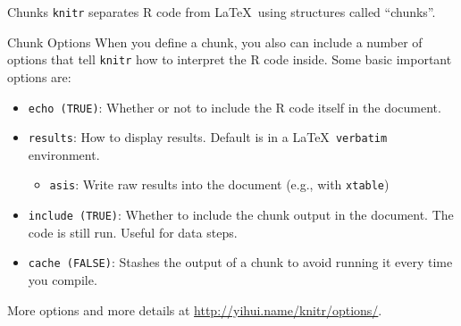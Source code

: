 \documentclass{beamer}
\begin{document}
	\begin{frame}{Chunks}
		\texttt{knitr} separates R code from \LaTeX \ using structures called ``chunks''.
	\end{frame}
	
	\begin{frame}{Chunk Options}
		When you define a chunk, you also can include a number of options that tell \texttt{knitr} how to interpret the R code inside. Some basic important options are:
		\begin{itemize}
			\item \texttt{echo (TRUE)}: Whether or not to include the R code itself in the document.
			\item \texttt{results}: How to display results. Default is in a \LaTeX \ \texttt{verbatim} environment.
			\begin{itemize}
				\item \texttt{asis}: Write raw results into the document (e.g., with \texttt{xtable})
			\end{itemize}
			\item \texttt{include (TRUE)}: Whether to include the chunk output in the document. The code is still run. Useful for data steps.
			\item \texttt{cache (FALSE)}: Stashes the output of a chunk to avoid running it every time you compile.
		\end{itemize}
		\footnotesize{More options and more details at \url{http://yihui.name/knitr/options/}.}
	\end{frame}
	
\end{document}
